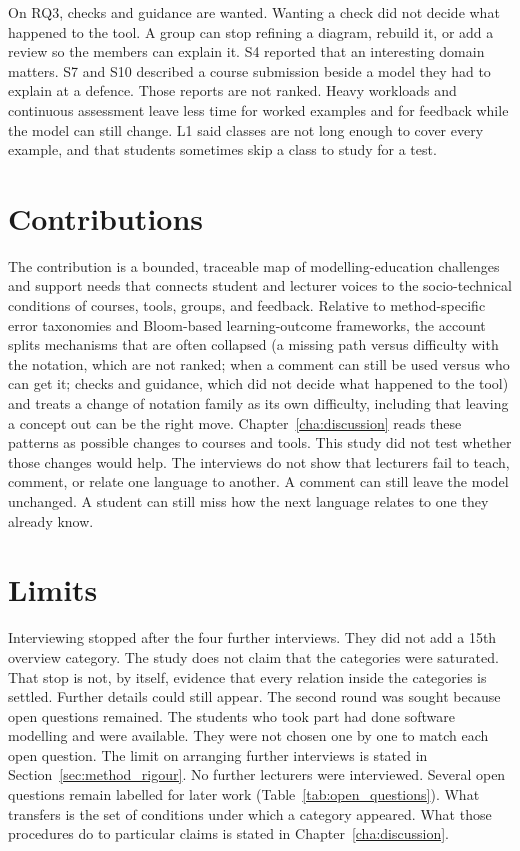 On RQ3, checks and guidance are wanted. Wanting a check did not decide what happened to the tool. A group can stop refining a diagram, rebuild it, or add a review so the members can explain it. S4 reported that an interesting domain matters. S7 and S10 described a course submission beside a model they had to explain at a defence. Those reports are not ranked. Heavy workloads and continuous assessment leave less time for worked examples and for feedback while the model can still change. L1 said classes are not long enough to cover every example, and that students sometimes skip a class to study for a test.

\section{Contributions}
\label{sec:conc_contributions}

The contribution is a bounded, traceable map of modelling-education challenges and support needs that connects student and lecturer voices to the socio-technical conditions of courses, tools, groups, and feedback. Relative to method-specific error taxonomies and Bloom-based learning-outcome frameworks, the account splits mechanisms that are often collapsed (a missing path versus difficulty with the notation, which are not ranked; when a comment can still be used versus who can get it; checks and guidance, which did not decide what happened to the tool) and treats a change of notation family as its own difficulty, including that leaving a concept out can be the right move. Chapter~\ref{cha:discussion} reads these patterns as possible changes to courses and tools. This study did not test whether those changes would help. The interviews do not show that lecturers fail to teach, comment, or relate one language to another. A comment can still leave the model unchanged. A student can still miss how the next language relates to one they already know.

\section{Limits}
\label{sec:conc_limits}

Interviewing stopped after the four further interviews. They did not add a 15th overview category. The study does not claim that the categories were saturated. That stop is not, by itself, evidence that every relation inside the categories is settled. Further details could still appear. The second round was sought because open questions remained. The students who took part had done software modelling and were available. They were not chosen one by one to match each open question. The limit on arranging further interviews is stated in Section~\ref{sec:method_rigour}. No further lecturers were interviewed. Several open questions remain labelled for later work (Table~\ref{tab:open_questions}). What transfers is the set of conditions under which a category appeared. What those procedures do to particular claims is stated in Chapter~\ref{cha:discussion}.


